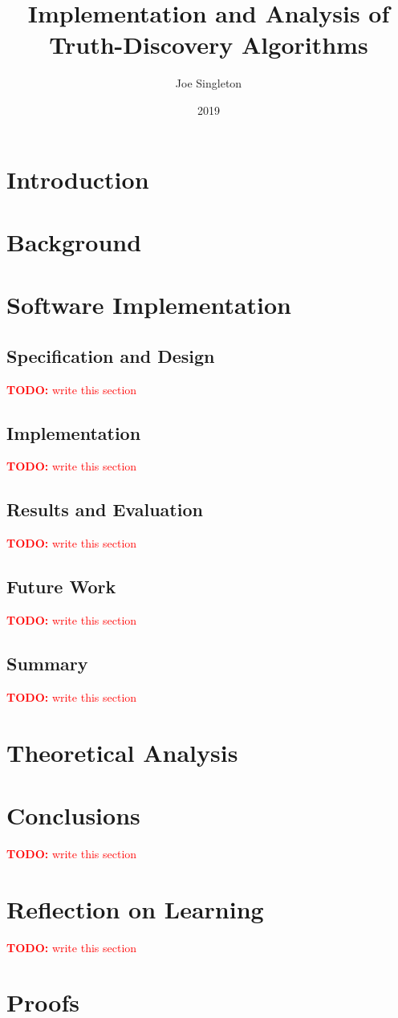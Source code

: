 \documentclass[12pt, oneside]{memoir}
\date{2019}
\author{Joe Singleton}
\title{Implementation and Analysis of Truth-Discovery Algorithms}
\theoremstyle{definition} \newtheorem{definition}{Definition}
\theoremstyle{definition} \newtheorem{example}{Example}
\theoremstyle{plain} \newtheorem{axiom}{Axiom}
\theoremstyle{plain} \newtheorem*{remark}{Remark}
\theoremstyle{remark} \newtheorem*{notation}{Notation}
\theoremstyle{plain} \newtheorem{lemma}{Lemma}
\theoremstyle{plain} \newtheorem{theorem}{Theorem}
\theoremstyle{plain} \newtheorem{proposition}{Proposition}
\newcommand{\todo}[1] {
    \textcolor{red}{
        \textbf{TODO:} #1
    }
}
\begin{document}
\frontmatter
\maketitle

\newpage



\tableofcontents

\mainmatter
\chapter{Introduction}


\chapter{Background}


\chapter{Software Implementation}
\section{Specification and Design}
\todo{write this section}
\section{Implementation}
\todo{write this section}
\section{Results and Evaluation}
\todo{write this section}
\section{Future Work}
\todo{write this section}
\section{Summary}
\todo{write this section}

\chapter{Theoretical Analysis}


\chapter{Conclusions}
\todo{write this section}
\chapter{Reflection on Learning}
\todo{write this section}

\printbibliography[heading=bibintoc]

\appendix
\chapter{Proofs}
\label{appendix:proofs}

\end{document}

